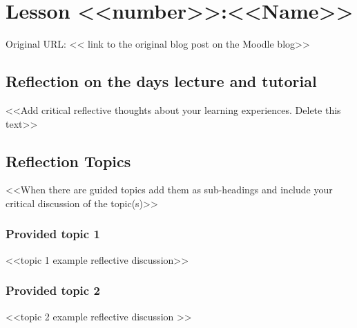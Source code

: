 

\section{Lesson <<number>>:<<Name>>} %

Original URL: << link to the original blog post on the Moodle blog>> %

\subsection{Reflection on the days lecture and tutorial}

<<Add critical reflective thoughts about your learning experiences. Delete this text>>

\blindtext[3] %

\subsection{Reflection Topics}

<<When there are guided topics add them as sub-headings and include your critical discussion of the topic(s)>>

\blindtext[3]  %

\subsubsection{Provided topic 1}

<<topic 1 example reflective discussion>>

\blindtext[3] %

\subsubsection{Provided topic 2}

<<topic 2 example reflective discussion >>





\blindtext[3] %